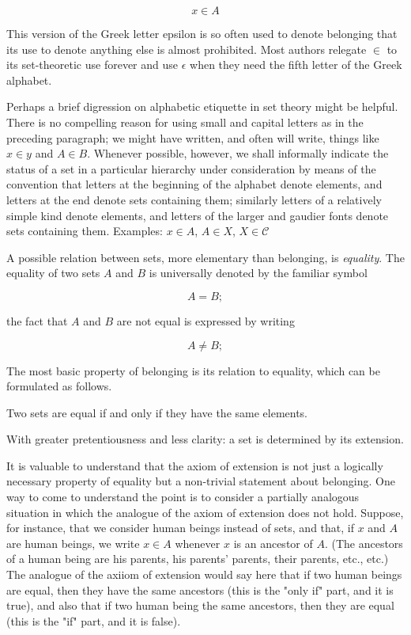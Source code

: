 \begin{equation*}
x \in A
\end{equation*}

	This version of the Greek letter epsilon is so often used to denote belonging that its use to denote anything else is almost prohibited. Most authors relegate $\in$ to its set-theoretic use forever and use $\epsilon$ when they need the fifth letter of the Greek alphabet. 


	Perhaps a brief digression on alphabetic etiquette in set theory might be helpful. There is no compelling reason for using small and capital letters as in the preceding paragraph; we might have written, and often will write, things like $x \in y$ and $A \in B$. Whenever possible, however, we shall informally indicate the status of a set in a particular hierarchy under consideration by means of the convention that letters at the beginning of the alphabet denote elements, and letters at the end denote sets containing them; similarly letters of a relatively simple kind denote elements, and letters of the larger and gaudier fonts denote sets containing them. Examples: $x \in A$, $A \in X$, $X \in \mathscr{C}$ %


	A possible relation between sets, more elementary than belonging, is \textit{equality}. The equality of two sets $A$ and $B$ is universally denoted by the familiar symbol 


\begin{equation*}
A = B;
\end{equation*}

	the fact that $A$ and $B$ are not equal is expressed by writing 

\begin{equation*}
A \neq B;
\end{equation*}

	The most basic property of belonging is its relation to equality, which can be formulated as follows. 

\begin{named} Two sets are equal if and only if they have the same elements.
\end{named}

	With greater pretentiousness and less clarity: a set is determined by its extension. 


	It is valuable to understand that the axiom of extension is not just a logically necessary property of equality but a non-trivial statement about belonging. One way to come to understand the point is to consider a partially analogous situation in which the analogue of the axiom of extension does not hold. Suppose, for instance, that we consider human beings instead of sets, and that, if $x$ and $A$ are human beings, we write $x \in A$ whenever $x$ is an ancestor of $A$. (The ancestors of a human being are his parents, his parents' parents, their parents, etc., etc.) The analogue of the axiiom of extension would say here that if two human beings are equal, then they have the same ancestors (this is the "only if" part, and it is true), and also that if two human being the same ancestors, then they are equal (this is the "if" part, and it is false). 


